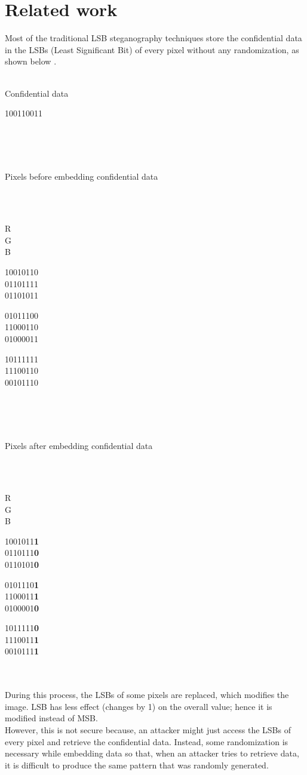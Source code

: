 \documentclass[conference]{IEEEtran}
\begin{document}
\section{Related work}
Most of the traditional LSB steganography techniques store the confidential data in the LSBs (Least Significant Bit) of every pixel without any randomization, as shown below
\cite{b1}. 
\\ \\
\centerline{ Confidential data }
\centerline{ 100110011 }
\leavevmode \\ \\ \\
\centerline{ Pixels before embedding confidential data }
\leavevmode \\ \\
\centerline{ R \\ G \\ B }
\centerline{ 10010110 \\ 01101111 \\ 01101011 }
\centerline{ 01011100 \\ 11000110 \\ 01000011 }
\centerline{ 10111111 \\ 11100110 \\ 00101110 }
\leavevmode \\ \\ \\
\centerline{ Pixels after embedding confidential data }
\leavevmode \\ \\
\centerline{ R \\ G \\ B }
\centerline{ 1001011\textbf{1} \\ 0110111\textbf{0} \\ 0110101\textbf{0} }
\centerline{ 0101110\textbf{1} \\ 1100011\textbf{1} \\ 0100001\textbf{0} }
\centerline{ 1011111\textbf{0} \\ 1110011\textbf{1} \\ 0010111\textbf{1} }
\leavevmode \\ \\

During this process, the LSBs of some pixels are replaced, which modifies the image.
LSB has less effect (changes by 1) on the overall value; hence it is modified instead of MSB.\\ 

However, this is not secure because, an attacker might just access the LSBs of every pixel and retrieve the confidential data. 
Instead, some randomization is necessary while embedding data so that, when an attacker tries to retrieve data, it is difficult to produce the same pattern that was randomly generated.\\
\end{document}
